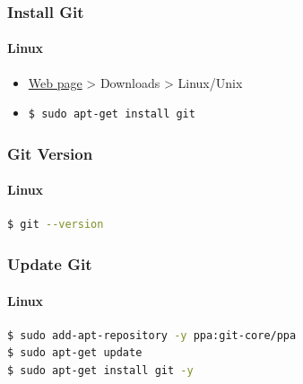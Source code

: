 \documentclass{beamer}
\begin{document}
	
	\begin{frame}[fragile]
		\frametitle{Install Git}
		\framesubtitle{Linux}
		
		\begin{itemize}
			\item \textcolor{light-primary}{\href{https://git-scm.com}{Web page}}
			> Downloads > Linux/Unix
			\item
\begin{lstlisting}[language=bash]
$ sudo apt-get install git
\end{lstlisting}		
		\end{itemize}
	
	\end{frame}
	
	\begin{frame}[fragile]
		\frametitle{Git Version}	
		\framesubtitle{Linux}	

\begin{lstlisting}[language=bash]
$ git --version
\end{lstlisting}	

	\end{frame}
	
	\begin{frame}[fragile]
		\frametitle{Update Git}
		\framesubtitle{Linux}
		
\begin{lstlisting}[language=bash]
$ sudo add-apt-repository -y ppa:git-core/ppa
$ sudo apt-get update
$ sudo apt-get install git -y
\end{lstlisting}		

	\end{frame}
	
\end{document}
